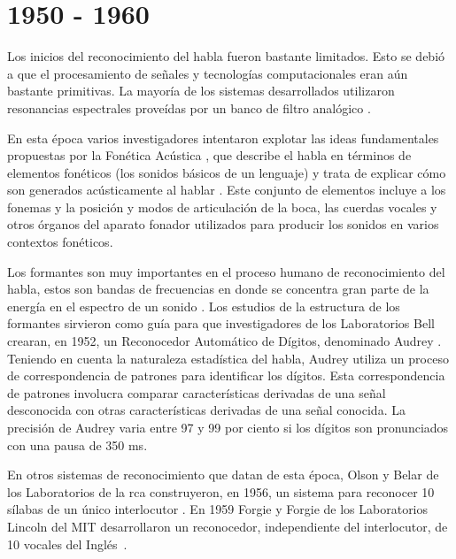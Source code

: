 \section{1950 - 1960}
\label{sec:50s}

Los inicios del reconocimiento del habla fueron bastante limitados. Esto se debi\'o a que el procesamiento 
de se\~{n}ales y tecnolog\'{i}as computacionales eran a\'un bastante primitivas. 
La mayor\'{i}a de los sistemas desarrollados utilizaron resonancias espectrales prove\'{i}das por 
un banco de filtro anal\'{o}gico \cite{Furui50Years2004}.
 
En esta \'{e}poca varios investigadores intentaron
explotar las ideas fundamentales propuestas por la Fon\'{e}tica Ac\'{u}stica \cite{AnusuyaSpeech2009}, que
describe el habla en t\'{e}rminos de elementos fon\'{e}ticos (los sonidos b\'{a}sicos de un lenguaje) y trata de
explicar c\'{o}mo son generados ac\'{u}sticamente al hablar \cite{JuangAutomaticSpeech}. 
Este conjunto de elementos incluye a los fonemas y la posici\'on y modos de articulaci\'on de la boca, 
las cuerdas vocales y otros \'organos del aparato fonador utilizados para producir los sonidos
en varios contextos fon\'{e}ticos.

Los formantes son muy importantes en el proceso humano de reconocimiento del habla, estos son bandas de frecuencias en 
donde se concentra gran parte de la energ\'{i}a en el espectro de un sonido \cite{HawkinsAcoustic2009}. Los estudios
de la estructura de los formantes sirvieron como gu\'{i}a para que investigadores de los Laboratorios Bell crearan,
en 1952, un Reconocedor Autom\'{a}tico de D\'{i}gitos, denominado Audrey \cite{DavisAutomatic1952}. 
Teniendo en cuenta la naturaleza estad\'{i}stica del habla, Audrey utiliza un proceso de correspondencia de patrones
para identificar los d\'{i}gitos. Esta correspondencia de patrones involucra comparar caracter\'{i}sticas derivadas
de una se\~{n}al desconocida con otras caracter\'{i}sticas derivadas de una se\~{n}al conocida. La precisi\'{o}n de
Audrey varia entre 97 y 99 por ciento si los d\'{i}gitos son pronunciados con una pausa de 350 ms.

En otros sistemas de reconocimiento que datan de esta \'{e}poca, Olson y Belar de los Laboratorios 
de la \gls{rca} construyeron, en 1956, un sistema para reconocer 10 s\'{i}labas de un \'{u}nico 
interlocutor \cite{OlsonPhonetic1956}. En 1959 Forgie y Forgie de los Laboratorios Lincoln del MIT 
desarrollaron un reconocedor, independiente del interlocutor, de 10 vocales del 
\mbox{Ingl\'{e}s \cite{ForgieResults1959}}.
